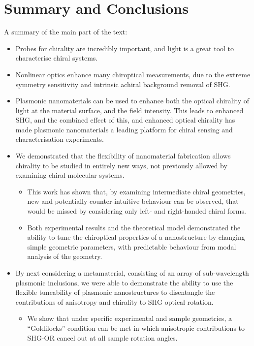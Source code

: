 \chapter{Summary and Conclusions}\label{sec:Conclusions}

\color{red}
A summary of the main part of the text:
\begin{itemize}
    \item Probes for chirality are incredibly important, and light is a great tool to characterise chiral systems.
    \item Nonlinear optics enhance many chiroptical measurements, due to the extreme symmetry sensitivity and intrinsic achiral background removal of SHG.
    \item Plasmonic nanomaterials can be used to enhance both the optical chirality of light at the material surface, and the field intensity. This leads to enhanced SHG, and the combined effect of this, and enhanced optical chirality has made plasmonic nanomaterials a leading platform for chiral sensing and characterisation experiments.
    \item We demonstrated that the flexibility of nanomaterial fabrication allows chirality to be studied in entirely new ways, not previously allowed by examining chiral molecular systems. 
    \begin{itemize}
        \item This work has shown that, by examining intermediate chiral geometries, new and potentially counter-intuitive behaviour can be observed, that would be missed by considering only left- and right-handed chiral forms. 
        \item Both experimental results and the theoretical model demonstrated the ability to tune the chiroptical properties of a nanostructure by changing simple geometric parameters, with predictable behaviour from modal analysis of the geometry. 
    \end{itemize}
    \item By next considering a metamaterial, consisting of an array of sub-wavelength plasmonic inclusions, we were able to demonstrate the ability to use the flexible tuneability of plasmonic nanostructures to disentangle the contributions of anisotropy and chirality to SHG optical rotation.
    \begin{itemize}
        \item We show that under specific experimental and sample geometries, a ``Goldilocks'' condition can be met in which anisotropic contributions to SHG-OR cancel out at all sample rotation angles. 

\end{itemize}
\end{itemize}
